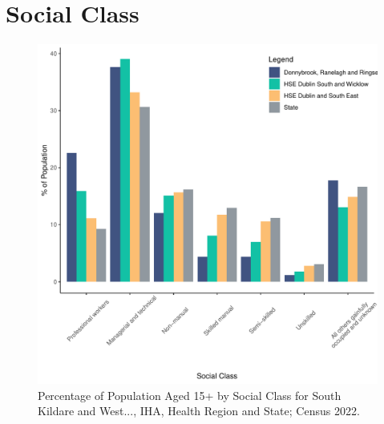 \documentclass{article}
\begin{document}
\section{Social Class}\label{sect:SC}
\begin{figure}[H]
	\centering
	\includegraphics[width = 140mm]{../figures/SocialClassED.pdf}
	\caption{Percentage of Population Aged 15+ by Social Class for South Kildare and West..., IHA, Health Region and State; Census 2022.}
	\label{fig:vbnv}
	\end{figure}
\end{document}

